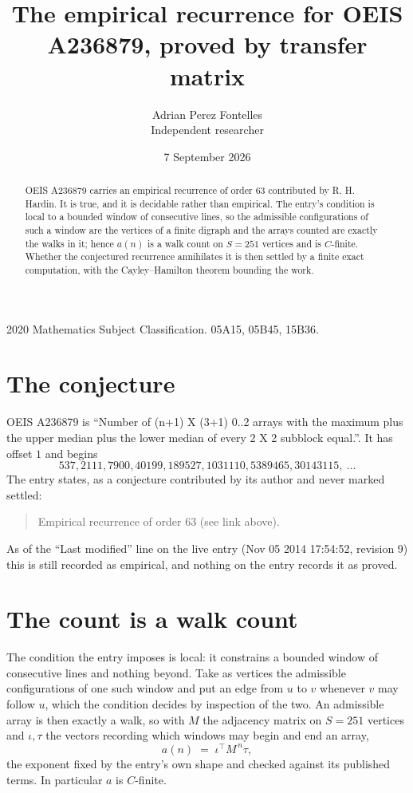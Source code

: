 \documentclass[11pt,a4paper]{article}
\title{The empirical recurrence for OEIS A236879, proved by transfer matrix}
\author{Adrian Perez Fontelles\\ \small Independent researcher}
\date{7 September 2026}
\theoremstyle{plain}
\theoremstyle{definition}
\begin{document}
\maketitle

\begin{abstract}
OEIS A236879 carries an empirical recurrence of order $63$ contributed by R. H. Hardin. It is
true, and it is decidable rather than empirical. The entry's condition is local to a bounded window of consecutive lines, so
the admissible configurations of such a window are the vertices of a finite digraph and the
arrays counted are exactly the walks in it; hence $a(n)$ is a walk count on $S=251$ vertices
and is $C$-finite. Whether the conjectured recurrence annihilates it is then settled by a
finite exact computation, with the Cayley--Hamilton theorem bounding the work.
\end{abstract}

\noindent\small 2020 Mathematics Subject Classification. 05A15, 05B45, 15B36.\normalsize

\section{The conjecture}

OEIS A236879 is ``Number of (n+1) X (3+1) 0..2 arrays with the maximum plus the upper median plus the lower median of every 2 X 2 subblock equal.''. It has offset $1$ and begins
\[
537, 2111, 7900, 40199, 189527, 1031110, 5389465, 30143115,\ \dots
\]
The entry states, as a conjecture contributed by its author and never marked settled:
\begin{quote}
Empirical recurrence of order 63 (see link above).
\end{quote}
As of the ``Last modified'' line on the live entry (Nov 05 2014 17:54:52, revision 9) this is still
recorded as empirical, and nothing on the entry records it as proved.

\section{The count is a walk count}

The condition the entry imposes is local: it constrains a bounded window of consecutive lines and nothing beyond. Take as
vertices the admissible configurations of one such window and put an edge from $u$ to $v$
whenever $v$ may follow $u$, which the condition decides by inspection of the two. An
admissible array is then exactly a walk, so with $M$ the adjacency matrix on $S=251$ vertices
and $\iota,\tau$ the vectors recording which windows may begin and end an array,
\[
a(n)\;=\;\iota^{\!\top}M^{\,n}\tau ,
\]
the exponent fixed by the entry's own shape and checked against its published terms. In
particular $a$ is $C$-finite.
\end{document}
